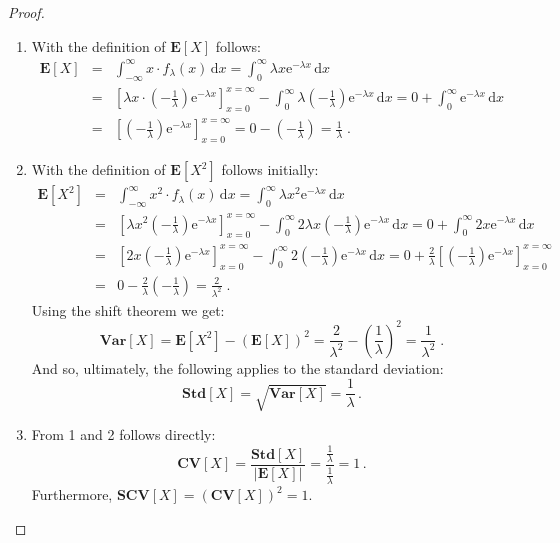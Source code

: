 \documentclass[a4paper,11pt,oneside]{article}
\theoremstyle{definition}
\begin{document}
\begin{proof}
\begin{enumerate}
\item
With the definition of $\mathbf{E}[X]$ follows:
\begin{eqnarray*}
\mathbf{E}[X]&=&
\int_{-\infty}^\infty x\cdot f_\lambda(x)\,\mbox{d}x=
\int_0^\infty \lambda x \mathrm{e}^{-\lambda x}\,\mbox{d}x\\&=&
\left[\lambda x\cdot\left(-\frac{1}{\lambda}\right)\mathrm{e}^{-\lambda x}\right]_{x=0}^{x=\infty}-
\int_0^\infty \lambda \left(-\frac{1}{\lambda}\right)\mathrm{e}^{-\lambda x}\,\mbox{d}x=
0+\int_0^\infty\mathrm{e}^{-\lambda x}\,\mbox{d}x\\&=&
\left[\left(-\frac{1}{\lambda}\right)\mathrm{e}^{-\lambda x}\right]_{x=0}^{x=\infty}=
0-\left(-\frac{1}{\lambda}\right)=
\frac{1}{\lambda}\;.
\end{eqnarray*}
\item
With the definition of $\mathbf{E}[X^2]$ follows initially:
\begin{eqnarray*}
\mathbf{E}[X^2]&=&
\int_{-\infty}^\infty x^2\cdot f_\lambda(x)\,\mbox{d}x=
\int_0^\infty \lambda x^2 \mathrm{e}^{-\lambda x}\,\mbox{d}x\\&=&
\left[\lambda x^2 \left(-\frac{1}{\lambda}\right)\mathrm{e}^{-\lambda x}\right]_{x=0}^{x=\infty}-
\int_0^\infty 2\lambda x \left(-\frac{1}{\lambda}\right)\mathrm{e}^{-\lambda x}\,\mbox{d}x=
0+\int_0^\infty 2x\mathrm{e}^{-\lambda x}\,\mbox{d}x\\&=&
\left[2x \left(-\frac{1}{\lambda}\right)\mathrm{e}^{-\lambda x}\right]_{x=0}^{x=\infty}-
\int_0^\infty 2\left(-\frac{1}{\lambda}\right)\mathrm{e}^{-\lambda x}\,\mbox{d}x=
0+\frac{2}{\lambda}\left[\left(-\frac{1}{\lambda}\right)\mathrm{e}^{-\lambda x}\right]_{x=0}^{x=\infty}\\&=&
0-\frac{2}{\lambda}\left(-\frac{1}{\lambda}\right)=
\frac{2}{\lambda^2}\;.
\end{eqnarray*}
Using the shift theorem we get:
$$
\mathbf{Var}[X]=\mathbf{E}[X^2]-\left(\mathbf{E}[X]\right)^2=\frac{2}{\lambda^2}-\left(\frac{1}{\lambda}\right)^2=\frac{1}{\lambda^2}\;.
$$
And so, ultimately, the following applies to the standard deviation:
$$
\mathbf{Std}[X]=\sqrt{\mathbf{Var}[X]}=\frac{1}{\lambda}\,.
$$
\item
From 1 and 2 follows directly:
$$
\mathbf{CV}[X]=\frac{\mathbf{Std}[X]}{|\mathbf{E}[X]|}=\frac{\frac{1}{\lambda}}{\frac{1}{\lambda}}=1\,.
$$
Furthermore, $\mathbf{SCV}[X]=\left(\mathbf{CV}[X]\right)^2=1$.
\end{enumerate}
\end{proof}
\end{document}
